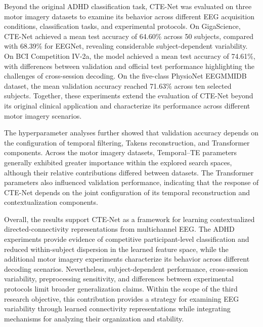 Beyond the original ADHD classification task, CTE-Net was evaluated on three motor imagery datasets to examine its behavior across different EEG acquisition conditions, classification tasks, and experimental protocols. On GigaScience, CTE-Net achieved a mean test accuracy of 64.60\% across 50 subjects, compared with 68.39\% for EEGNet, revealing considerable subject-dependent variability. On BCI Competition IV-2a, the model achieved a mean test accuracy of 74.61\%, with differences between validation and official test performance highlighting the challenges of cross-session decoding. On the five-class PhysioNet EEGMMIDB dataset, the mean validation accuracy reached 71.63\% across ten selected subjects. Together, these experiments extend the evaluation of CTE-Net beyond its original clinical application and characterize its performance across different motor imagery scenarios.

The hyperparameter analyses further showed that validation accuracy depends on the configuration of temporal filtering, Takens reconstruction, and Transformer components. Across the motor imagery datasets, Temporal--TE parameters generally exhibited greater importance within the explored search spaces, although their relative contributions differed between datasets. The Transformer parameters also influenced validation performance, indicating that the response of CTE-Net depends on the joint configuration of its temporal reconstruction and contextualization components.

Overall, the results support CTE-Net as a framework for learning contextualized directed-connectivity representations from multichannel EEG. The ADHD experiments provide evidence of competitive participant-level classification and reduced within-subject dispersion in the learned feature space, while the additional motor imagery experiments characterize its behavior across different decoding scenarios. Nevertheless, subject-dependent performance, cross-session variability, preprocessing sensitivity, and differences between experimental protocols limit broader generalization claims. Within the scope of the third research objective, this contribution provides a strategy for examining EEG variability through learned connectivity representations while integrating mechanisms for analyzing their organization and stability.
